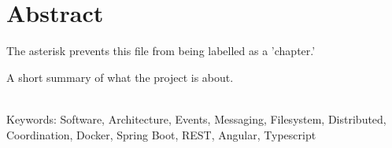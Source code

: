 
\chapter*{Abstract}
 The asterisk prevents this file from being labelled
 as a 'chapter.'

A short summary of what the project is about.


~\\
Keywords: Software, Architecture, Events, Messaging, Filesystem, Distributed, Coordination, Docker, Spring Boot, REST, Angular, Typescript